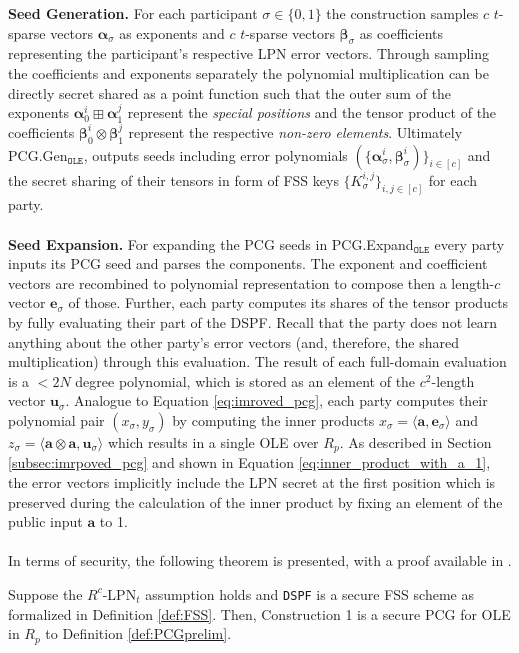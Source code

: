 \textbf{Seed Generation.} For each participant $\sigma \in \{0,1\}$ the construction samples $c$ $t$-sparse vectors $\boldsymbol{\alpha}_\sigma$ as exponents and $c$ $t$-sparse vectors $\boldsymbol{\beta}_\sigma$ as coefficients representing the participant's respective LPN error vectors. Through sampling the coefficients and exponents separately the polynomial multiplication can be directly secret shared as a point function such that the outer sum of the exponents $\boldsymbol{\alpha}_{0}^{i} \boxplus \boldsymbol{\alpha}_{1}^{j}$ represent the \textit{special positions} and the tensor product of the coefficients $\boldsymbol{\beta}_{0}^{i} \otimes \boldsymbol{\beta}_{1}^{j}$ represent the respective \textit{non-zero elements}. Ultimately PCG.Gen$_{\texttt{OLE}}$, outputs seeds including error polynomials $(\{\boldsymbol{\alpha}_\sigma^i, \boldsymbol{\beta}_\sigma^i)\}_{i\in[c]}$ and the secret sharing of their tensors in form of FSS keys $\{K_\sigma^{i,j}\}_{i,j\in[c]}$  for each party. 
\\\\
\textbf{Seed Expansion.}
For expanding the PCG seeds in PCG.Expand$_{\texttt{OLE}}$ every party inputs its PCG seed and parses the components. The exponent and coefficient vectors are recombined to polynomial representation to compose then a length-$c$ vector $\boldsymbol{e}_\sigma$ of those. Further, each party computes its shares of the tensor products by fully evaluating their part of the DSPF. Recall that the party does not learn anything about the other party's error vectors (and, therefore, the shared multiplication) through this evaluation. The result of each full-domain evaluation is a $<2N$ degree polynomial, which is stored as an element of the $c^2$-length vector $\boldsymbol{u}_\sigma$. Analogue to Equation \ref{eq:imroved_pcg}, each party computes their polynomial pair $(x_\sigma , y_\sigma)$ by computing the inner products $x_\sigma = \langle\boldsymbol{a},\boldsymbol{e}_\sigma\rangle$ and $z_\sigma = \langle\boldsymbol{a}\otimes\boldsymbol{a},\boldsymbol{u}_\sigma\rangle$ which results in a single OLE over $R_p$. As described in Section \ref{subsec:imrpoved_pcg} and shown in Equation \ref{eq:inner_product_with_a_1}, the error vectors implicitly include the LPN secret at the first position which is preserved during the calculation of the inner product by fixing an element of the public input $\boldsymbol{a}$ to 1. 
\\\\
In terms of security, the following theorem is presented, with a proof available in \cite{boyle2020efficient}.
\begin{theorem}
Suppose the $R^c$-LPN$_t$ assumption holds and \texttt{DSPF} is a secure FSS scheme as formalized in Definition \ref{def:FSS}. Then, Construction 1 is a secure PCG for OLE in $R_p$ to Definition \ref{def:PCGprelim}.
\label{theorem:olepcg}
\end{theorem}

